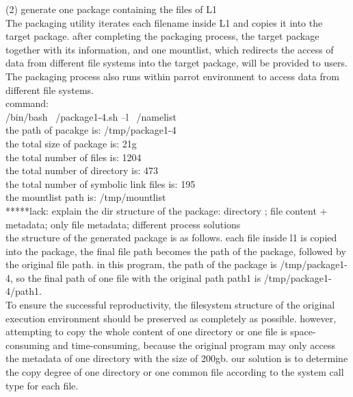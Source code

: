 \documentclass{article}
\begin{document}
(2) generate one package containing the files of L1 \\
\indent The packaging utility iterates each filename inside L1 and copies it into the target package. after completing the packaging process, the target package together with its information, and one mountlist, which redirects the access of data from different file systems into the target package, will be provided to users.\\

The packaging process also runs within parrot environment to access data from different file systems.\\
\indent command:\\
\indent /bin/bash ~/package1-4.sh –l ~/namelist\\
\indent the path of pacakge is: /tmp/package1-4\\
\indent the total size of package is: 21g\\
\indent the total number of files is: 1204\\
\indent the total number of directory is: 473\\
\indent the total number of symbolic link files is: 195\\
\indent the mountlist path is: /tmp/mountlist\\

*****lack: explain the dir structure of the package:  directory ; file content + metadata; only file metadata; different process solutions\\

the structure of the generated package is as follows. each file inside l1 is copied into the package, the final file path becomes the path of the package, followed by the original file path. in this program, the path of the package is /tmp/package1-4, so the final path of one file with the original path path1 is /tmp/package1-4/path1.\\

To ensure the successful reproductivity, the filesystem structure of the original execution environment should be preserved as completely as possible. however, attempting to copy the whole content of one directory or one file is space-consuming and time-consuming, because the original program may only access the metadata of one directory with the size of 200gb. our solution is to determine the copy degree of one directory or one common file according to the system call type for each file.\\
\end{document}
